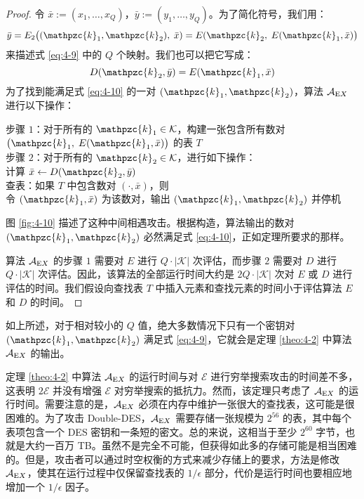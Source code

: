 \begin{proof}
令 $\bar{x}:=(x_1,\dots,x_Q)$，$\bar{y}:=(y_1,\dots,y_Q)$。为了简化符号，我们用：
\[
\bar y=E_2\big((\mathpzc{k}_1,\mathpzc{k}_2),\;\bar x)=E(\mathpzc{k}_2,\;E(\mathpzc{k}_1,\bar x)\big)
\]
来描述式 \ref{eq:4-9} 中的 $Q$ 个映射。我们也可以把它写成：
\begin{equation}\label{eq:4-10}
D(\mathpzc{k}_2,\bar y)=E(\mathpzc{k}_1,\bar x)
\end{equation}
为了找到能满足式 \ref{eq:4-10} 的一对 $(\mathpzc{k}_1,\mathpzc{k}_2)$，算法 $\mathcal{A}_{{\rm E}X}$ 进行以下操作：

\vspace*{10pt}

\hspace*{5pt} 步骤 $1$：对于所有的 $\mathpzc{k}_1\in\mathcal{K}$，构建一张包含所有数对 $\big(\mathpzc{k}_1,\;E(\mathpzc{k}_1,\bar x)\big)$ 的表 $T$\\
\hspace*{26pt} 步骤 $2$：对于所有的 $\mathpzc{k}_2\in\mathcal{K}$，进行如下操作：\\
\hspace*{80pt} 计算 $\bar x\leftarrow D(\mathpzc{k}_2,\bar y)$\\
\hspace*{80pt} 查表：如果 $T$ 中包含数对 $(\cdot,\bar x)$，则\\
\hspace*{112pt} 令 $(\mathpzc{k}_1,\bar x)$ 为该数对，输出 $(\mathpzc{k}_1,\mathpzc{k}_2)$ 并停机

\vspace*{10pt}

\noindent
图 \ref{fig:4-10} 描述了这种中间相遇攻击。根据构造，算法输出的数对 $(\mathpzc{k}_1,\mathpzc{k}_2)$ 必然满足式 \ref{eq:4-10}，正如定理所要求的那样。

算法 $\mathcal{A}_{{\rm E}X}$ 的步骤 $1$ 需要对 $E$ 进行 $Q\cdot|\mathcal{K}|$ 次评估，而步骤 $2$ 需要对 $D$ 进行 $Q\cdot|\mathcal{K}|$ 次评估。因此，该算法的全部运行时间大约是 $2Q\cdot|\mathcal{K}|$ 次对 $E$ 或 $D$ 进行评估的时间。我们假设向查找表 $T$ 中插入元素和查找元素的时间小于评估算法 $E$ 和 $D$ 的时间。
\end{proof}

如上所述，对于相对较小的 $Q$ 值，绝大多数情况下只有一个密钥对 $(\mathpzc{k}_1,\mathpzc{k}_2)$ 满足式 \ref{eq:4-9}，它就会是定理 \ref{theo:4-2} 中算法 $\mathcal{A}_{{\rm E}X}$ 的输出。

定理 \ref{theo:4-2} 中算法 $\mathcal{A}_{{\rm E}X}$ 的运行时间与对 $\mathcal{E}$ 进行穷举搜索攻击的时间差不多，这表明 $2\mathcal{E}$ 并没有增强 $\mathcal{E}$ 对穷举搜索的抵抗力。然而，该定理只考虑了 $\mathcal{A}_{{\rm E}X}$ 的运行时间。需要注意的是，$\mathcal{A}_{{\rm E}X}$ 必须在内存中维护一张很大的查找表，这可能是很困难的。为了攻击 Double-DES，$\mathcal{A}_{{\rm E}X}$ 需要存储一张规模为 $2^{56}$ 的表，其中每个表项包含一个 DES 密钥和一条短的密文。总的来说，这相当于至少 $2^{60}$ 字节，也就是大约一百万 TB。虽然不是完全不可能，但获得如此多的存储可能是相当困难的。但是，攻击者可以通过时空权衡的方式来减少存储上的要求，方法是修改 $\mathcal{A}_{{\rm E}X}$，使其在运行过程中仅保留查找表的 ${1}/{\epsilon}$ 部分，代价是运行时间也要相应地增加一个 ${1}/{\epsilon}$ 因子。


